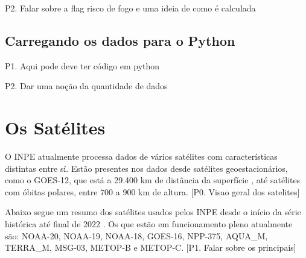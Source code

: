 \documentclass[cic,tc]{iiufrgs}
\begin{document}
P2. Falar sobre a flag risco de fogo e uma ideia de como é calculada \par

\subsection{Carregando os dados para o Python} 

P1. Aqui pode deve ter código em python \par
P2. Dar uma noção da quantidade de dados \par

\section{Os Satélites}

O INPE atualmente processa dados de vários satélites com características
distintas entre sí. Estão presentes nos dados desde satélites geoestacionários, 
como o GOES-12, que está a 29.400 km de distância da superfície 
\citep{GOES12Algo}, até satélites com óbitas polares, entre 700 a 900 km de altura.
[P0. Visao geral dos satelites] \par

Abaixo segue um resumo dos satélites usados pelos INPE desde  o início da 
série histórica até final de 2022 \cite{EmbrapaSatelites}. 
Os que estão em funcionamento pleno atualmente são:
NOAA-20, NOAA-19, NOAA-18, GOES-16, NPP-375, AQUA\_M, TERRA\_M, MSG-03, 
METOP-B e METOP-C. [P1. Falar sobre os principais]\par
\end{document}

